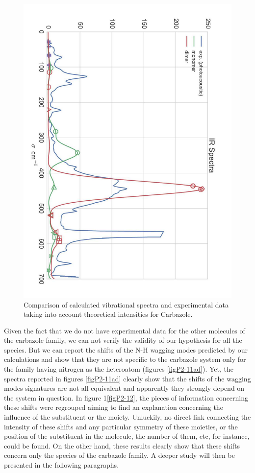 	 	\begin{figure}[H]
	 		\begin{center}
	 			\includegraphics[angle=90,scale=0.5]{image/10}
	 		\end{center}
	 		\caption{Comparison of calculated vibrational spectra and experimental data taking into account theoretical intensities for Carbazole.}  \label{figP2-10}
	 	\end{figure}
	 
	 Given the fact that we do not have experimental data for the other molecules of the carbazole family, we can not verify the validity of our hypothesis for all the species. But we can report the shifts of the N-H wagging modes predicted by our calculations and show that they are not specific to the carbazole system only for the family having nitrogen as the heteroatom (figures \ref{figP2-11ad}). Yet, the spectra reported in figures \ref{figP2-11ad} clearly show that the shifts of the wagging modes signatures are not all equivalent and apparently they strongly depend on the system in question. In figure 1\ref{figP2-12}, the pieces of information concerning these shifts were regrouped aiming to find an explanation concerning the influence of the substituent or the moiety. Unluckily, no direct link connecting the intensity of these shifts and any particular symmetry of these moieties, or the position of the substituent in the molecule, the number of them, etc, for instance, could be found. On the other hand, these results clearly show that these shifts concern only the species of the carbazole family. A deeper study will then be presented in the following paragraphs. 
	
